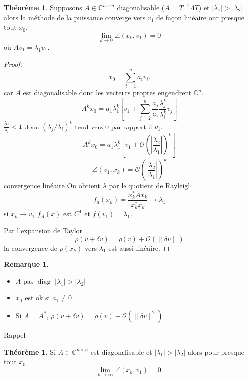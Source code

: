 \documentclass[11pt,a4paper]{article}
\newcommand{\C}{\mathbb{C}}
\newcommand{\Cn}{\C^n}
\newcommand{\Cnn}{\C^{n\times n}}
\theoremstyle{definition}
\newtheorem{myrem}[mydef]{Remarque}
\newtheorem{mytheo}[mydef]{Théorème}
\newcommand{\bigoh}{\mathcal{O}}
\DeclareMathOperator{\diag}{diag}
\begin{document}
\begin{mytheo}
  Supposons $A \in \Cnn$ diagonalisable ($A = T^{-1} \Lambda T$) et $|\lambda_1| > |\lambda_2|$
  alors la méthode de la puissance converge
  vers $v_1$ de façon linéaire our presque tout $x_0$.
  $$\lim_{k \to 0} \angle(x_k,v_1) = 0$$
  où $Av_1 = \lambda_1v_1$.
  \begin{proof}
    $$x_0 = \sum_{i=1}^n a_iv_i.$$
    car $A$ est diagonalisable donc les vecteurs propres engendrent $\Cn$.
    $$A^kx_0 = a_1\lambda_1^k\left[v_1 + \sum_{j=2}^n\frac{a_j}{a_i}\frac{\lambda_j^k}{\lambda_i^k}v_j\right]$$
    $\frac{\lambda_j}{\lambda_i}< 1$ donc $(\lambda_j/\lambda_i)^k$ tend vers 0 par rapport à $v_1$.
    $$A^kx_0 = a_1\lambda_1^k\left[v_1 + \bigoh(\left|\frac{\lambda_2}{\lambda_1}\right|)^k\right]$$
    $$\angle(v_1,x_k) = \bigoh\left(\left|\frac{\lambda_2}{\lambda_1}\right|\right)^k$$
    convergence linéaire
    On obtient $\lambda$ par le quotient de Rayleigl
    $$f_a(x_k) = \frac{x_k^*Ax_k}{x_k^*x_k} \rightarrow \lambda_1$$
    si $x_k \to v_1$ $f_A(x)$ est $C^1$ et $f(v_1) = \lambda_1$.

    Par l'expansion de Taylor
    $$\rho(v + \delta v) = \rho(v) + \bigoh(\|\delta v\|)$$
    la convergence de $\rho(x_k)$ vers $\lambda_1$ est aussi linéaire.
  \end{proof}
\end{mytheo}

\begin{myrem}
  \begin{itemize}
    \item $A$ pas $\diag$ $|\lambda_1| > |\lambda_2|$
    \item $x_0$ est ok si $a_1 \neq 0$
    \item Si $A = A^*$, $\rho(v + \delta v) = \rho(v) + \bigoh(\|\delta v\|^2)$
  \end{itemize}
\end{myrem}


Rappel
\begin{mytheo}
  Si $A \in \Cnn$ est diagonalisable et $|\lambda_1| > |\lambda_2|$ alors pour presque tout $x_0$
  $$\lim_{k\to\infty} \angle(x_k,v_1) = 0.$$
\end{mytheo}
\end{document}
